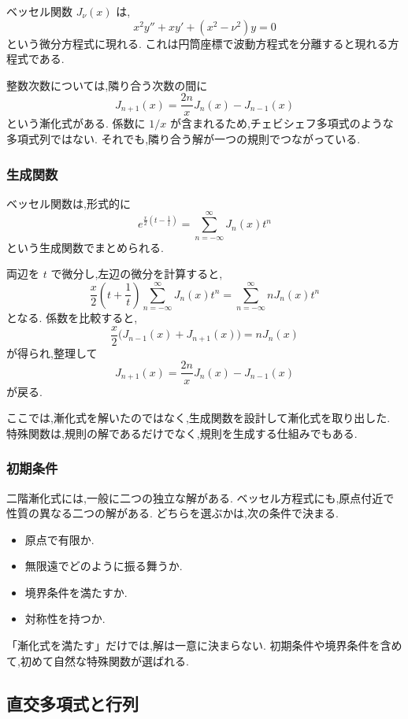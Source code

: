 ベッセル関数 $J_\nu(x)$ は,
\[
  x^2y''+xy'+(x^2-\nu^2)y=0
\]
という微分方程式に現れる.
これは円筒座標で波動方程式を分離すると現れる方程式である.

整数次数については,隣り合う次数の間に
\[
  J_{n+1}(x)
  =\frac{2n}{x}J_n(x)-J_{n-1}(x)
\]
という漸化式がある.
係数に $1/x$ が含まれるため,チェビシェフ多項式のような多項式列ではない.
それでも,隣り合う解が一つの規則でつながっている.

\subsubsection{生成関数}

ベッセル関数は,形式的に
\[
  e^{\frac{x}{2}\left(t-\frac1t\right)}
  =\sum_{n=-\infty}^{\infty}J_n(x)t^n
\]
という生成関数でまとめられる.

両辺を $t$ で微分し,左辺の微分を計算すると,
\[
  \frac{x}{2}\left(t+\frac1t\right)
  \sum_{n=-\infty}^{\infty}J_n(x)t^n
  =
  \sum_{n=-\infty}^{\infty}nJ_n(x)t^n
\]
となる.
係数を比較すると,
\[
  \frac{x}{2}\bigl(J_{n-1}(x)+J_{n+1}(x)\bigr)
  =nJ_n(x)
\]
が得られ,整理して
\[
  J_{n+1}(x)=\frac{2n}{x}J_n(x)-J_{n-1}(x)
\]
が戻る.

ここでは,漸化式を解いたのではなく,生成関数を設計して漸化式を取り出した.
特殊関数は,規則の解であるだけでなく,規則を生成する仕組みでもある.

\subsubsection{初期条件}

二階漸化式には,一般に二つの独立な解がある.
ベッセル方程式にも,原点付近で性質の異なる二つの解がある.
どちらを選ぶかは,次の条件で決まる.

\begin{itemize}
  \item 原点で有限か.
  \item 無限遠でどのように振る舞うか.
  \item 境界条件を満たすか.
  \item 対称性を持つか.
\end{itemize}

「漸化式を満たす」だけでは,解は一意に決まらない.
初期条件や境界条件を含めて,初めて自然な特殊関数が選ばれる.

\subsection{直交多項式と行列}

